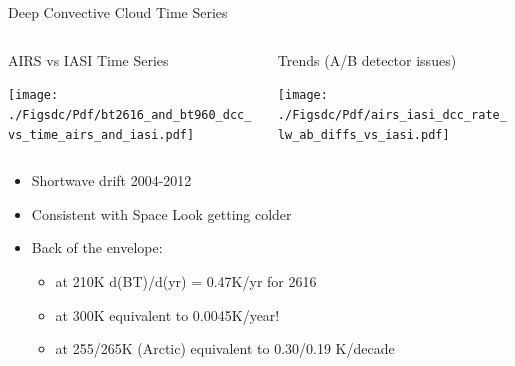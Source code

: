 \documentclass[10pt,t]{beamer}
\begin{document}
\begin{frame}[label={sec:org3a5ad85}]{Deep Convective Cloud Time Series}
\vspace{-0.35in}

\begin{columns}
\begin{column}{0.5\columnwidth}
\begin{block}{\footnotesize AIRS vs IASI Time Series}
\vspace{-0.1in}
\begin{center}
\texttt{[image: ./Figsdc/Pdf/bt2616\_and\_bt960\_dcc\_vs\_time\_airs\_and\_iasi.pdf]}
\end{center}
\end{block}
\end{column}

\begin{column}{0.5\columnwidth}
\begin{block}{\footnotesize Trends (A/B detector issues)}
\vspace{-0.1in}
\begin{center}
\texttt{[image: ./Figsdc/Pdf/airs\_iasi\_dcc\_rate\_lw\_ab\_diffs\_vs\_iasi.pdf]}
\end{center}
\end{block}
\end{column}
\end{columns}

\vspace{-0.1in}
\begin{footnotesize}
\begin{itemize}
\item Shortwave drift 2004-2012
\item Consistent with Space Look getting colder
\item Back of the envelope: 
\begin{itemize}
\item at 210K d(BT)/d(yr) = 0.47K/yr for 2616 \wn
\item at 300K equivalent to 0.0045K/year!
\item at 255/265K (Arctic) equivalent to 0.30/0.19 K/decade
\end{itemize}
\end{itemize}

\end{footnotesize}
\end{frame}
\end{document}
